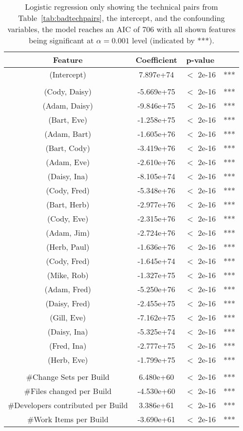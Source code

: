 \begin{table}[t!]
\centering
\caption{Logistic regression only showing the technical pairs from Table~\ref{tab:badtechpairs}, the intercept, and the confounding variables, the model reaches an AIC of 706 with all shown features being significant at $\alpha=0.001$ level (indicated by ***).}
\begin{tabular}{cccc}
\toprule
Feature & Coefficient & p-value & \\
\midrule
(Intercept)            &  7.897e+74 &  $<$ 2e-16 & ***\\
\\
(Cody, Daisy)  &  	-5.669e+75  &  $<$ 2e-16 & ***\\
(Adam, Daisy)  &   -9.846e+75  &   $<$ 2e-16 &***\\
(Bart, Eve)  	&   -1.258e+75  &$<$ 2e-16 &***\\
(Adam, Bart)  	&   -1.605e+76  & $<$ 2e-16 &***\\
(Bart, Cody)  	&   -3.419e+76  & $<$ 2e-16 &***\\
(Adam, Eve)  	&   -2.610e+76  & $<$ 2e-16 &***\\
(Daisy, Ina)  	&  	-8.105e+74 	 &  $<$ 2e-16 &***\\
(Cody, Fred)  	&   -5.348e+76  &$<$ 2e-16 &***\\
(Bart, Herb)  	&   -2.977e+76  &$<$ 2e-16 &***\\
(Cody, Eve)  	&   -2.315e+76  & $<$ 2e-16 &***\\
(Adam, Jim)  	&   -2.724e+76    & $<$ 2e-16 &***\\
(Herb, Paul)  	&   -1.636e+76      &$<$ 2e-16 &***\\
(Cody, Fred)  	&   -1.645e+74     & $<$ 2e-16 &***\\
(Mike, Rob)  	&   -1.327e+75    & $<$ 2e-16 &***\\
(Adam, Fred)  	&   -5.250e+76     & $<$ 2e-16 &***\\
(Daisy, Fred)  &   -2.455e+75      &$<$ 2e-16 &***\\
(Gill, Eve)	  	&   -7.162e+75    & $<$ 2e-16 &***\\
(Daisy, Ina)  	&   -5.325e+74      &$<$ 2e-16 &***\\
(Fred, Ina)  	&   -2.777e+75     & $<$ 2e-16 &***\\
(Herb, Eve)  	&   -1.799e+75     & $<$ 2e-16 &***\\
\\
\#Change Sets per Build     & \phantom{-}6.480e+60 &   $<$ 2e-16 &***\\
\#Files changed per Build            &-4.530e+60 &  $<$ 2e-16 &***\\
{\#Developers contributed per Build}  &   \phantom{-}3.386e+61 & $<$ 2e-16 &***\\
\#Work Items per Build    &  -3.690e+61   & $<$ 2e-16 &***\\
\bottomrule
\end{tabular}
\label{tab:regression}
\end{table}





